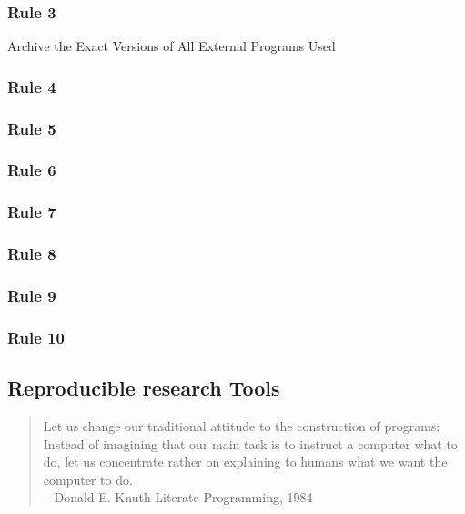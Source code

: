 \documentclass{beamer}
\begin{document}
\begin{frame}
\frametitle{Rule 3}
\small{\sc Archive the Exact Versions of All External Programs Used}

\end{frame}
\begin{frame}
\frametitle{Rule 4}


\end{frame}
\begin{frame}
\frametitle{Rule 5}


\end{frame}
\begin{frame}
\frametitle{Rule 6}


\end{frame}
\begin{frame}
\frametitle{Rule 7}


\end{frame}
\begin{frame}
\frametitle{Rule 8}


\end{frame}
\begin{frame}
\frametitle{Rule 9}


\end{frame}
\begin{frame}
\frametitle{Rule 10}


\end{frame}
\begin{frame}
\section{Reproducible research Tools}
\begin{quote}
\scriptsize    Let us change our traditional attitude to the construction of programs: Instead of imagining that our main task is to instruct a computer what to do, let us concentrate rather on explaining to humans what we want the computer to do.\\
\raggedleft   -- Donald E. Knuth Literate Programming, 1984
\end{quote}
\end{frame}
\end{document}
